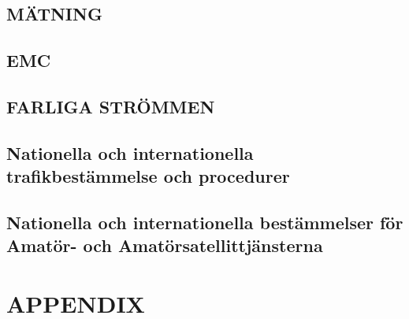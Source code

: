 \documentclass[a4paper,twoside,twocolumn,openright]{book}
\begin{document}
\chapter{MÄTNING}

\cleardoublepage


\chapter{EMC}

\cleardoublepage

\cleardoublepage

\cleardoublepage


\chapter{FARLIGA STRÖMMEN}

\cleardoublepage

\cleardoublepage

\cleardoublepage




\chapter{Nationella och internationella trafikbestämmelse och procedurer}

\cleardoublepage

\cleardoublepage

\cleardoublepage

\cleardoublepage

\cleardoublepage


\chapter{Nationella och internationella bestämmelser för Amatör- och
  Amatörsatellittjänsterna}

\cleardoublepage

\cleardoublepage

\cleardoublepage



\appendix
\part{APPENDIX}













\listoffigures
\listoftables

\backmatter

\printindex
\end{document}

